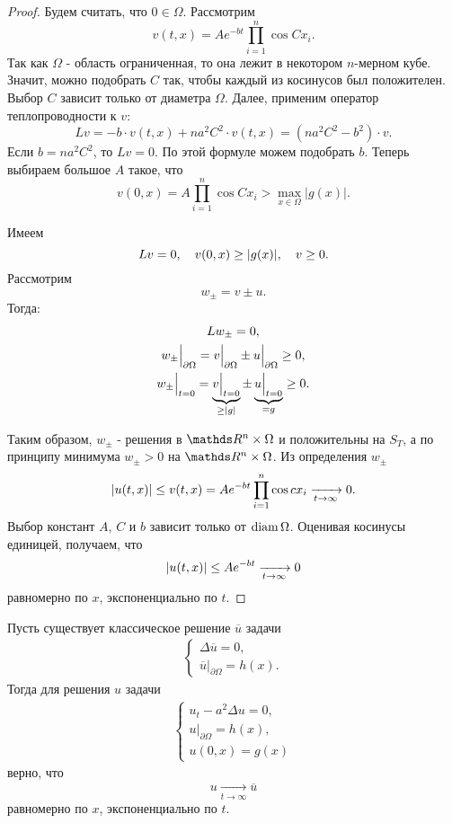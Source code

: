 \begin{proof}
Будем считать, что $0 \in \Omega$. Рассмотрим
$$ v(t,x) = A e^{-bt} \prod \limits_{i=1}^n \cos C x_i. $$
Так как $\Omega$ - область ограниченная, то она лежит в некотором $n$-мерном кубе. Значит, можно подобрать $C$ так, чтобы каждый из косинусов был положителен. Выбор $C$ зависит только от диаметра $\Omega$. Далее, применим оператор теплопроводности к $v$:
$$ Lv = -b \cdot v(t,x) + n a^2 C^2 \cdot v(t,x) = (na^2C^2 - b^2) \cdot v.$$
Если $b = n a^2 C^2$, то $Lv = 0$. По этой формуле можем подобрать $b$. Теперь выбираем большое $A$ такое, что
$$ v(0,x) = A \prod \limits_{i=1}^n \cos C x_i > \max_{x \in \Omega} |g(x)|.$$

Имеем $$Lv = 0,\quad v(0,x) \geq \lvert g(x)\rvert,\quad v \geq 0 .$$ Рассмотрим
$$ w_{\pm} = v \pm u.$$
Тогда:
\begin{gather*}
	Lw_{\pm} = 0, \\
	w_{\pm}\Big\rvert_{\partial \Omega} = v\Big\rvert_{\partial \Omega} \pm u\Big\rvert_{\partial \Omega} \geq 0, \\
	w_{\pm}\Big\rvert_{t=0} = \underbrace {v\Big\rvert_{t=0}}_{\geq \lvert g\rvert} \pm \underbrace{u\Big\rvert_{t=0}}_{=g} \geq 0.
\end{gather*}

Таким образом, $w_{\pm}$ - решения в $\real^n \times \Omega$ и положительны на $S_T$, а по принципу минимума $w_{\pm} > 0$  на $\real^n \times \Omega$. Из определения $w_{\pm}$ 
$$\lvert u(t,x)\rvert \leq v(t,x) = A e^{-bt} \prod \limits_{i=1}^n \cos c x_i \xrightarrow[t \to \infty]{} 0.$$
Выбор констант $A$, $C$ и $b$ зависит только от $\operatorname{diam} \Omega$. Оценивая косинусы единицей, получаем, что
$$ \lvert u(t,x)\rvert \leq A e^{-bt} \xrightarrow[t \to \infty]{} 0$$
равномерно по $x$, экспоненциально по $t$.

\end{proof}


\begin{note} Пусть существует классическое решение $\overline{u}$ задачи
\begin{gather*}
	\begin{cases*}
		\Delta \overline{u} = 0, \\
		\overline{u}\Big\rvert_{\partial \Omega} = h(x).
	\end{cases*}
\end{gather*}
Тогда для решения $u$ задачи 
\begin{gather*}
	\begin{cases*}
		u_t - a^2 \Delta u = 0, \\
		u \Big\rvert_{\partial \Omega} = h(x), \\
		u(0, x) = g(x)
	\end{cases*}
\end{gather*}
верно, что $$u \xrightarrow[t \to \infty]{} \overline{u}$$
равномерно по $x$, экспоненциально по $t$.
\end{note}

